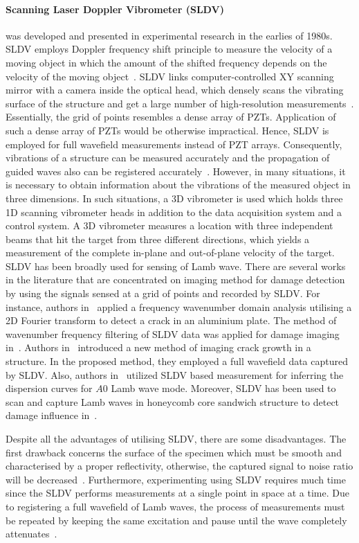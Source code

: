 \paragraph{Scanning Laser Doppler Vibrometer (SLDV)} was developed and presented in experimental research in the earlies of 1980s. 
SLDV employs Doppler frequency shift principle to measure the velocity of a moving object in which the amount of the shifted frequency depends on the velocity of the moving object~\cite{Stanbridge1999}. 
SLDV links computer-controlled XY scanning mirror with a camera inside the optical head, which densely scans the vibrating surface of the structure and get a large number of high-resolution measurements~\cite{Helfrick2011}. 
Essentially, the grid of points resembles a dense array of PZTs. 
Application of such a dense array of PZTs would be otherwise impractical.  
Hence, SLDV is employed for full wavefield measurements instead of PZT arrays. 
Consequently, vibrations of a structure can be measured accurately and the propagation of guided waves also can be registered accurately~\cite{Ostachowicz2014}.
However, in many situations, it is necessary to obtain information about the vibrations of the measured object in three dimensions. 
In such situations, a 3D vibrometer is used which holds three 1D scanning vibrometer heads in addition to the data acquisition system and a control system.
A 3D vibrometer measures a location with three independent beams that hit the target from three different directions, which yields a measurement of the complete in-plane and out-of-plane velocity of the target.
SLDV has been broadly used for sensing of Lamb wave. 
There are several works in the literature that are concentrated on imaging method for damage detection by using the signals sensed at a grid of points and recorded by SLDV.
For instance, authors in~\cite{Yu2013} applied a frequency wavenumber domain analysis utilising a 2D Fourier transform to detect a crack in an aluminium plate. 
The method of wavenumber frequency filtering of SLDV data was applied for damage imaging in~\cite{Ruzzene2007}. 
Authors in~\cite{Kudela2015} introduced a new method of imaging crack growth in a structure.
In the proposed method, they employed a full wavefield data captured by SLDV.
Also, authors in~\cite{Harb2015} utilized SLDV based measurement for inferring  the dispersion curves for \(A0\) Lamb wave mode. 
Moreover, SLDV has been used to scan and capture Lamb waves in honeycomb core sandwich structure to detect damage influence in~\cite{Lamboul2013}.

Despite all the advantages of utilising SLDV, there are some disadvantages. 
The first drawback concerns the surface of the specimen which must be smooth and characterised by a proper reflectivity, otherwise, the captured signal to noise ratio will be decreased~\cite{Ostachowicz2014}. 
Furthermore, experimenting using  SLDV requires much time since the SLDV performs measurements at a single point in space at a time.
Due to registering a full wavefield of Lamb waves, the process of measurements must be repeated by keeping the same excitation and pause until the wave completely attenuates~\cite{Ostachowicz2014}.